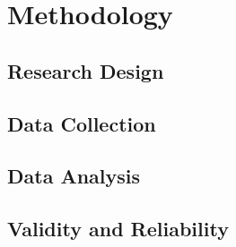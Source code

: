 \chapter{Methodology}
\label{chap:method}


\section{Research Design}
\label{sec:research-design}


\section{Data Collection}
\label{sec:data-collection}


\section{Data Analysis}
\label{sec:data-analysis}


\section{Validity and Reliability}
\label{sec:validity}
